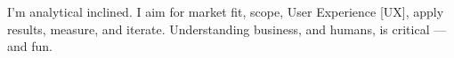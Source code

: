 
I'm analytical inclined.
I aim for market fit, scope, User Experience {\scriptsize[UX]}, apply results, measure, and iterate.
Understanding business, and humans, is critical ---and fun.

%
 
% 
% 
% 
% 


